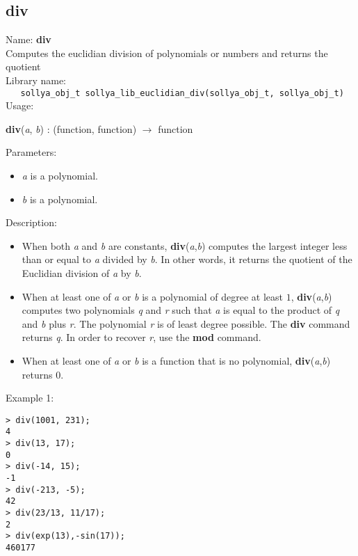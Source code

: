 \subsection{div}
\label{labeucldiv}
\noindent Name: \textbf{div}\\
\phantom{aaa}Computes the euclidian division of polynomials or numbers and returns the quotient\\[0.2cm]
\noindent Library name:\\
\verb|   sollya_obj_t sollya_lib_euclidian_div(sollya_obj_t, sollya_obj_t)|\\[0.2cm]
\noindent Usage: 
\begin{center}
\textbf{div}(\emph{a}, \emph{b}) : (\textsf{function}, \textsf{function}) $\rightarrow$ \textsf{function}\\
\end{center}
Parameters: 
\begin{itemize}
\item \emph{a} is a polynomial.
\item \emph{b} is a polynomial.
\end{itemize}
\noindent Description: \begin{itemize}

\item When both \emph{a} and \emph{b} are constants, \textbf{div}(\emph{a},\emph{b}) computes the
   largest integer less than or equal to \emph{a} divided by \emph{b}. In other
   words, it returns the quotient of the Euclidian division of \emph{a} by
   \emph{b}.

\item When at least one of \emph{a} or \emph{b} is a polynomial of degree at least
   $1$, \textbf{div}(\emph{a},\emph{b}) computes two polynomials \emph{q} and \emph{r} such
   that \emph{a} is equal to the product of \emph{q} and \emph{b} plus \emph{r}. The
   polynomial \emph{r} is of least degree possible. The \textbf{div} command
   returns \emph{q}. In order to recover \emph{r}, use the \textbf{mod} command.

\item When at least one of \emph{a} or \emph{b} is a function that is no polynomial,
   \textbf{div}(\emph{a},\emph{b}) returns $0$.
\end{itemize}
\noindent Example 1: 
\begin{center}\begin{minipage}{15cm}\begin{Verbatim}[frame=single]
> div(1001, 231);
4
> div(13, 17);
0
> div(-14, 15);
-1
> div(-213, -5);
42
> div(23/13, 11/17);
2
> div(exp(13),-sin(17));
460177
\end{Verbatim}
\end{minipage}\end{center}
